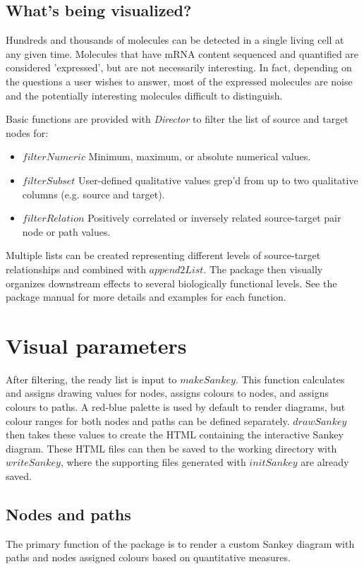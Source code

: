 \documentclass[a4paper]{article}
\begin{document}
\subsection{What's being visualized?}
Hundreds and thousands of molecules can be detected in a single living cell at any given time. Molecules that have mRNA content sequenced and quantified are considered 'expressed', but are not necessarily interesting. In fact, depending on the questions a user wishes to answer, most of the expressed molecules are noise and the potentially interesting molecules difficult to distinguish.

Basic functions are provided with \textit{Director} to filter the list of source and target nodes for:
\begin{itemize}
    \item $filterNumeric$ Minimum, maximum, or absolute numerical values.
    \item $filterSubset$ User-defined qualitative values grep'd from up to two qualitative columns (e.g. source and target).
    \item $filterRelation$ Positively correlated or inversely related source-target pair node or path values.
\end{itemize}
\noindent Multiple lists can be created representing different levels of source-target relationships and combined with $append2List$. The package then visually organizes downstream effects to several biologically functional levels. See the package manual for more details and examples for each function.

\section{Visual parameters}
After filtering, the ready list is input to $makeSankey$. This function calculates and assigns drawing values for nodes, assigns colours to nodes, and assigns colours to paths. A red-blue palette is used by default to render diagrams, but colour ranges for both nodes and paths can be defined separately. $drawSankey$ then takes these values to create the HTML containing the interactive Sankey diagram. These HTML files can then be saved to the working directory with $writeSankey$, where the supporting files generated with $initSankey$ are already saved.

\subsection{Nodes and paths}
The primary function of the package is to render a custom Sankey diagram with paths and nodes assigned colours based on quantitative measures.
\end{document}
